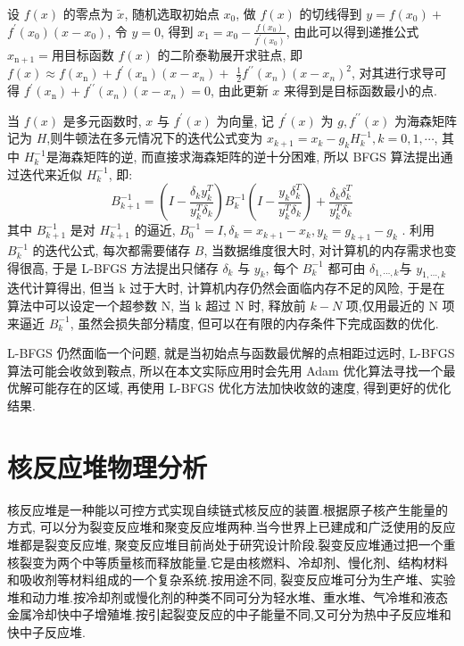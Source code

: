 \documentclass{Sichuan Normal University}
\begin{document}
设 $f(x)$ 的零点为 $\tilde{x}$, 随机选取初始点 $x_0$, 做 $f(x)$ 的切线得到 $y=f\left(x_0\right)+$ $f^{\prime}\left(x_0\right)\left(x-x_0\right)$, 令 $y=0$, 得到 $x_1=x_0-\frac{f\left(x_0\right)}{f^{\prime}\left(x_0\right)}$, 
由此可以得到递推公式 $x_{\mathrm{n}+1}=$用目标函数 $f(x)$ 的二阶泰勒展开求驻点, 即 $f(x) \approx f\left(x_{\mathrm{n}}\right)+f^{\prime}\left(x_{\mathrm{n}}\right)\left(x-x_n\right)+$ $\frac{1}{2} f^{\prime \prime}\left(x_n\right)\left(x-x_n\right)^2$, 
对其进行求导可得 $f^{\prime}\left(x_{\mathrm{n}}\right)+f^{\prime \prime}\left(x_n\right)\left(x-x_n\right)=0$, 由此更新 $x$ 来得到是目标函数最小的点.

当 $f(x)$ 是多元函数时, $x$ 与 $f^{\prime}(x)$ 为向量, 记 $f^{\prime}(x)$ 为 $g, f^{\prime \prime}(x)$ 为海森矩阵记为 $H$,则牛顿法在多元情况下的迭代公式变为 $x_{k+1}=x_k-g_k H_k^{-1}, k=0,1, \cdots$, 其中 $H_k^{-1}$是海森矩阵的逆, 
而直接求海森矩阵的逆十分困难, 所以 BFGS 算法提出通过迭代来近似 $H_k^{-1}$, 即:
\begin{equation}
    B_{k+1}^{-1}=\left(I-\frac{\delta_k y_k^T}{y_k^T \delta_k}\right) B_k^{-1}\left(I-\frac{y_k \delta_k^T}{y_k^T \delta_k}\right)+\frac{\delta_k \delta_k^T}{y_k^T \delta_k}
\label{eq:BFGS}
\end{equation}其中 $B_{k+1}^{-1}$ 是对 $H_{k+1}^{-1}$ 的逼近, $B_0^{-1}=I, \delta_k=x_{k+1}-x_k, y_k=g_{k+1}-g_k$ .
利用 $B_k^{-1}$ 的迭代公式, 每次都需要储存 $B$, 当数据维度很大时, 对计算机的内存需求也变得很高, 于是 L-BFGS 方法提出只储存 $\delta_k$ 与 $y_k$, 每个 $B_k^{-1}$ 都可由 $\delta_{1, \cdots, k}$与 $y_{1, \cdots, k}$ 迭代计算得出, 但当 $\mathrm{k}$ 过于大时, 计算机内存仍然会面临内存不足的风险, 于是在算法中可以设定一个超参数 $\mathrm{N}$, 当 $\mathrm{k}$ 超过 $\mathrm{N}$ 时, 释放前 $k-N$ 项,仅用最近的 $\mathrm{N}$ 项来逼近 $B_k^{-1}$, 虽然会损失部分精度, 但可以在有限的内存条件下完成函数的优化.

L-BFGS 仍然面临一个问题, 就是当初始点与函数最优解的点相距过远时, L-BFGS 算法可能会收敛到鞍点, 所以在本文实际应用时会先用 Adam 优化算法寻找一个最优解可能存在的区域, 再使用 L-BFGS 优化方法加快收敛的速度, 得到更好的优化结果.

\section{核反应堆物理分析}

核反应堆是一种能以可控方式实现自续链式核反应的装置.根据原子核产生能量的方式, 可以分为裂变反应堆和聚变反应堆两种\cite{XieZhongShengHeFanYingDuiWuLiFenXi2020}.当今世界上已建成和广泛使用的反应堆都是裂变反应堆, 聚变反应堆目前尚处于研究设计阶段.裂变反应堆通过把一个重核裂变为两个中等质量核而释放能量.它是由核燃料、冷却剂、慢化剂、结构材料和吸收剂等材料组成的一个复杂系统.按用途不同, 裂变反应堆可分为生产堆、实验堆和动力堆.按冷却剂或慢化剂的种类不同可分为轻水堆、重水堆、气冷堆和液态金属冷却快中子增殖堆.按引起裂变反应的中子能量不同,又可分为热中子反应堆和快中子反应堆.
\end{document}

